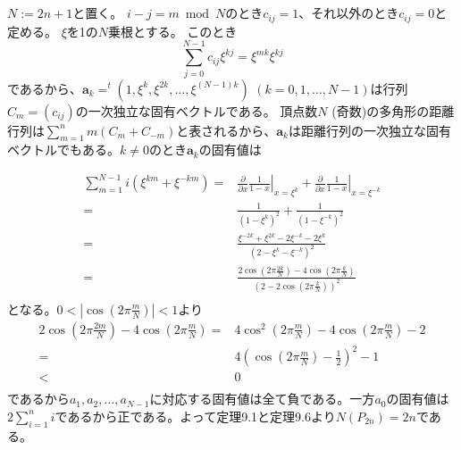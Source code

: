 \subsection{}
$N:=2n+1$と置く。
$i-j=m\bmod N$のとき$c_{ij}=1
$、それ以外のとき$c_{ij}=0$と定める。
$\xi$を1の$N$乗根とする。
このとき
$$\sum_{j=0}^{N-1} c_{ij}\xi^{kj} = \xi^{mk} \xi^{kj}$$
であるから、$\bm{a}_k=^t(1,\xi^k,\xi^{2k},\ldots,\xi^{(N-1)k})$ $(k=0,1,\ldots,N-1)$は行列$C_m=(c_{ij})$の一次独立な固有ベクトルである。
頂点数$N$ (奇数)の多角形の距離行列は$\sum_{m=1}^n m(C_m+C_{-m})$と表されるから、$\bm{a}_k$は距離行列の一次独立な固有ベクトルでもある。$k\neq 0$のとき$\bm{a}_k$の固有値は

\begin{align*}
 \sum_{m=1}^{N-1} i(\xi^{km}+\xi^{-km})
=& \left.\frac{\partial}{\partial x} \frac{1}{1-x}\right|_{x=\xi^k}+\left.\frac{\partial}{\partial x} \frac{1}{1-x}\right|_{x=\xi^{-k}}\\
=& \frac{1}{(1-\xi^k)^2}+\frac{1}{(1-\xi^{-k})^2}\\
=& \frac{\xi^{-2k}+\xi^{2k}-2\xi^{-k}-2\xi^{k}}{(2-\xi^k-\xi^{-k})^2}\\
=& \frac{2\cos\left(2\pi \frac{2k}{N}\right)-4\cos\left(2\pi \frac{k}{N}\right)}{\left(2-2\cos\left(2\pi \frac{k}{N}\right)\right)^2}\\
\end{align*}
となる。$0<|\cos\left(2\pi \frac{m}{N}\right)|<1$より
\begin{align*}
2\cos\left(2\pi \frac{2m}{N}\right)-4\cos\left(2\pi \frac{m}{N}\right)
=&4\cos^2\left(2\pi \frac{m}{N}\right)-4\cos\left(2\pi \frac{m}{N}\right)-2\\
=&4\left(\cos\left(2\pi \frac{m}{N}\right)-\frac{1}{2}\right)^2-1\\
< &0\\
\end{align*}
であるから$a_{1},a_{2},\ldots,a_{N-1}$に対応する固有値は全て負である。一方$a_0$の固有値は$2\sum_{i=1}^n i$であるから正である。よって定理9.1と定理9.6より$N(P_{2n})=2n$である。
